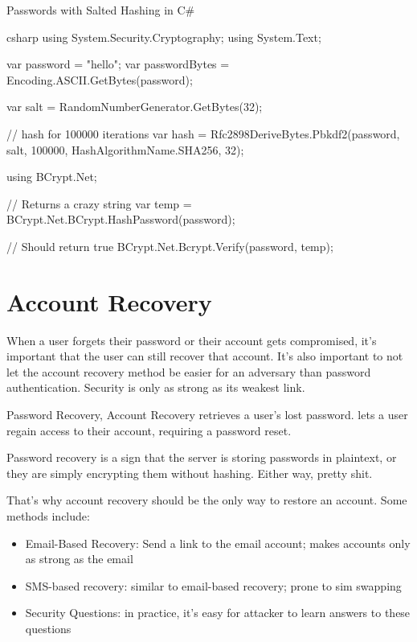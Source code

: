 \documentclass[12pt]{report}
\begin{document}
\begin{codebox}{Passwords with Salted Hashing in C\#}{}{}
    \begin{amzcode}{csharp}
using System.Security.Cryptography;
using System.Text;

var password = "hello";
var passwordBytes = Encoding.ASCII.GetBytes(password);

var salt = RandomNumberGenerator.GetBytes(32);

// hash for 100000 iterations
var hash = Rfc2898DeriveBytes.Pbkdf2(password, salt, 100000, HashAlgorithmName.SHA256, 32);

using BCrypt.Net;

// Returns a crazy string
var temp = BCrypt.Net.BCrypt.HashPassword(password);

// Should return true
BCrypt.Net.Bcrypt.Verify(password, temp);
    \end{amzcode}
\end{codebox}

\section{Account Recovery}

When a user forgets their password or their account gets compromised, it's important that the user can still recover that account. It's also important to not let the account recovery method be easier for an adversary than password authentication. Security is only as strong as its weakest link.

\begin{dfnbox}{Password Recovery, Account Recovery}{}
     retrieves a user's lost password.  lets a user regain access to their account, requiring a password reset.
\end{dfnbox}

Password recovery is a sign that the server is storing passwords in plaintext, or they are simply encrypting them without hashing. Either way, pretty shit.

That's why account recovery should be the only way to restore an account. Some methods include:
\begin{itemize}[noitemsep]
    \item Email-Based Recovery: Send a link to the email account; makes accounts only as strong as the email
    \item SMS-based recovery: similar to email-based recovery; prone to sim swapping
    \item Security Questions: in practice, it's easy for attacker to learn answers to these questions
\end{itemize}
\end{document}

